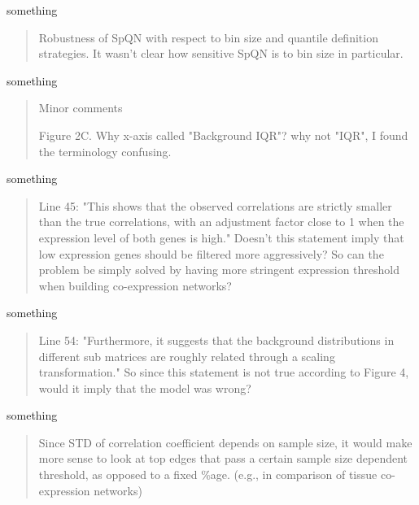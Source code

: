 \documentclass[english,letterpaper,pdftex,12pt]{article}
\begin{document}
\begin{response}
  something
\end{response}

\begin{quote}
Robustness of SpQN with respect to bin size and quantile definition strategies. It wasn't clear how sensitive SpQN is to bin size in particular.
\end{quote}

\begin{response}
  something
\end{response}

\begin{quote}
Minor comments

Figure 2C. Why x-axis called "Background IQR"? why not "IQR",  I found the terminology confusing.
\end{quote}

\begin{response}
  something
\end{response}

\begin{quote}
Line 45: "This shows that the observed correlations are strictly smaller than the true correlations, with an adjustment factor close to 1 when the expression level of both genes is high." Doesn't this statement imply that low expression genes should be filtered more aggressively? So can the problem be simply solved by having more stringent expression threshold when building co-expression networks?
\end{quote}

\begin{response}
  something
\end{response}

\begin{quote}
Line 54: "Furthermore, it suggests that the background distributions in different sub matrices are roughly related through a scaling transformation." So since this statement is not true according to Figure 4, would it imply that the model was wrong?
\end{quote}

\begin{response}
  something
\end{response}

\begin{quote}
Since STD of correlation coefficient depends on sample size, it would make more sense to look at top edges that pass a certain sample size dependent threshold, as opposed to a fixed \%age. (e.g., in comparison of tissue co-expression networks)
\end{quote}
\end{document}
